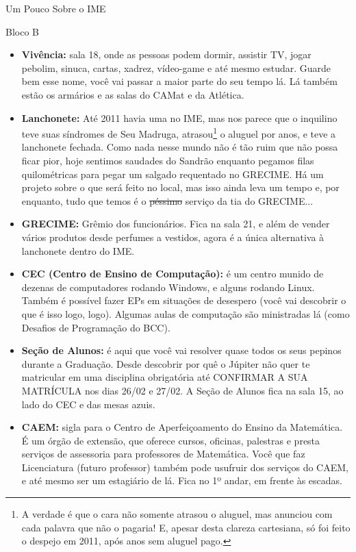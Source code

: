 \begin{secao}{Um Pouco Sobre o IME}
\begin{subsecao}{Bloco B}
\begin{itemize}
\item {\bf Vivência:} sala 18, onde as pessoas podem dormir, assistir TV, jogar pebolim, sinuca, cartas, xadrez, vídeo-game e até mesmo estudar. Guarde bem
esse nome, você vai passar a maior parte do seu tempo lá. Lá também estão os
armários e as salas do CAMat e da Atlética. 

\item {\bf Lanchonete:} Até 2011 havia uma no IME, mas nos parece que o inquilino
teve suas síndromes de Seu Madruga, atrasou\footnote{A verdade é que o cara não
somente atrasou o aluguel, mas anunciou com cada palavra que não o pagaria! E,
apesar desta clareza cartesiana, só foi feito o despejo em 2011, após anos sem
aluguel pago.} o aluguel por anos, e teve a lanchonete fechada. Como nada nesse
mundo não é tão ruim que não possa ficar pior, hoje sentimos saudades do Sandrão
enquanto pegamos filas quilométricas para pegar um salgado requentado no GRECIME.
Há um projeto sobre o que será feito no local, mas isso ainda leva um tempo e, por enquanto,
tudo que temos é o \sout{péssimo} serviço da tia do GRECIME... 

\item {\bf GRECIME:} Grêmio dos funcionários. Fica na sala 21, e além de vender
vários produtos desde perfumes a vestidos, agora é a única alternativa à
lanchonete dentro do IME.

\item {\bf CEC (Centro de Ensino de Computação):} é um centro munido de dezenas
de computadores rodando Windows, e alguns rodando Linux. Também é possível fazer
EPs em situações de desespero (você vai descobrir o que é isso logo, logo). Algumas
aulas de computação são ministradas lá (como Desafios de Programação do BCC).
 
\item {\bf Seção de Alunos:} é aqui que você vai resolver quase todos os seus
 pepinos durante a Graduação. Desde descobrir por quê o Júpiter não quer te matricular
em uma disciplina obrigatória até CONFIRMAR A SUA MATRÍCULA nos dias 26/02 e 27/02.
A Seção de Alunos fica na sala 15, ao lado do CEC e das mesas azuis.

\item {\bf CAEM:} sigla para o Centro de Aperfeiçoamento do Ensino da Matemática.
É um órgão de extensão, que oferece cursos, oficinas, palestras e presta serviços
de assessoria para professores de Matemática. Você que faz Licenciatura (futuro professor) também pode usufruir dos serviços do CAEM, e até mesmo ser um
estagiário de lá. Fica no 1º andar, em frente às escadas.


\end{itemize}
\end{subsecao}
\end{secao}
